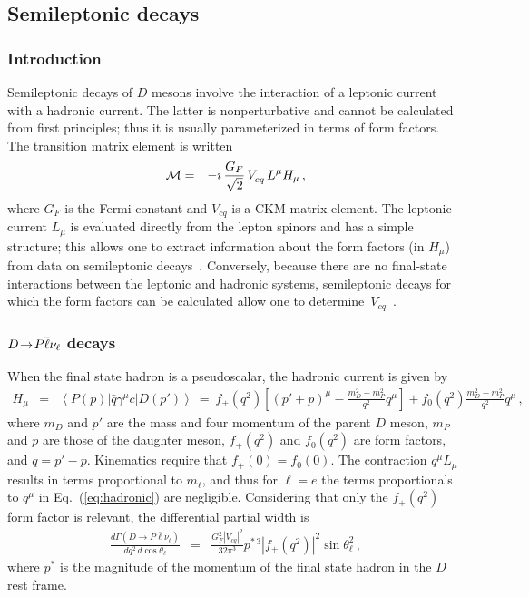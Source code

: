 \subsection{Semileptonic decays}
\label{sec:charm:semileptonic}

\subsubsection{Introduction}

Semileptonic decays of $D$ mesons involve the interaction of a leptonic
current with a hadronic current. The latter is nonperturbative
and cannot be calculated from first principles; thus it is usually
parameterized in terms of form factors. The transition matrix element 
is written
\begin{eqnarray}
  {\cal M} & = & -i\,\frac{G_F}{\sqrt{2}}\,V^{}_{cq}\,L^\mu H_\mu\,,
  \label{Melem}
\end{eqnarray}
where $G_F$ is the Fermi constant and $V^{}_{cq}$ is a CKM matrix element.
The leptonic current $L_\mu$ is evaluated directly from the lepton spinors 
and has a simple structure; this allows one to extract information about 
the form factors (in $H^{}_\mu$) from data on semileptonic decays~\cite{Becher:2005bg}.  
Conversely, because there are no final-state interactions between the
leptonic and hadronic systems, semileptonic decays for which the form 
factors can be calculated allow one to 
determine~$V^{}_{cq}$~\cite{Kobayashi:1973fv}.

\subsubsection{$D\!\rightarrow\! P \overline \ell \nu_{\ell}$ decays}

When the final state hadron is a pseudoscalar, the hadronic 
current is given by
\begin{eqnarray}
H_\mu & = & \left< P(p) | \bar{q}\gamma^\mu c | D(p') \right> \ =\  
f_+(q^2)\left[ (p' + p)^\mu -\frac{m_D^2-m_P^2}{q^2}q^\mu\right] + 
 f_0(q^2)\frac{m_D^2-m_P^2}{q^2}q^\mu\,,
\label{eq:hadronic}
\end{eqnarray}
where $m_D$ and $p'$ are the mass and four momentum of the 
parent $D$ meson, $m_P$ and $p$ are those of the daughter meson, 
$f_+(q^2)$ and $f_0(q^2)$ are form factors, and $q = p' - p$.  
Kinematics require that $f_+(0) = f_0(0)$.
The contraction $q^\mu L_\mu$ results in terms proportional 
to $m^{}_\ell$\cite{Gilman:1989uy}, and thus for $\ell=e $
the terms proportionals to $q^\mu$ in Eq.~(\ref{eq:hadronic}) are negligible. 
Considering that only the $f_+(q^2)$ form factor 
is relevant, the differential partial width is
\begin{eqnarray}
\frac{d\Gamma(D \to P \bar \ell \nu_\ell)}{dq^2\, d\cos\theta_\ell} & = & 
   \frac{G_F^2|V_{cq}|^2}{32\pi^3} p^{*\,3}|f_{+}(q^2)|^2\sin\theta^2_\ell\,,
\label{eq:dGamma}
\end{eqnarray}
where ${p^*}$ is the magnitude of the momentum of the final state hadron
in the $D$ rest frame.

